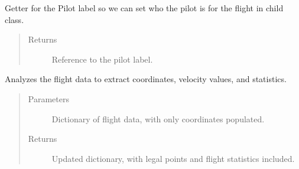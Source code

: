 \documentclass[letterpaper,10pt,english]{sphinxmanual}
\begin{document}
\begin{fulllineitems}
\begin{fulllineitems}
\begin{quote}
\begin{description}
\end{description}\end{quote}

\end{fulllineitems}


\begin{fulllineitems}
\label{\detokenize{index:src.Views.View_ReportScreen.ReportWindow.LblPilot}}
Getter for the Pilot label so we can set who the pilot is for the flight in child class.
\begin{quote}\begin{description}
\item[{Returns}] \leavevmode
Reference to the pilot label.

\end{description}\end{quote}

\end{fulllineitems}


\begin{fulllineitems}
\label{\detokenize{index:src.Views.View_ReportScreen.ReportWindow.analyzeFlight}}
Analyzes the flight data to extract coordinates, velocity values, and statistics.
\begin{quote}\begin{description}
\item[{Parameters}] \leavevmode
{} \textendash{} Dictionary of flight data, with only coordinates populated.

\item[{Returns}] \leavevmode
Updated dictionary, with legal points and flight statistics included.

\end{description}\end{quote}

\end{fulllineitems}


\end{fulllineitems}
\end{document}
